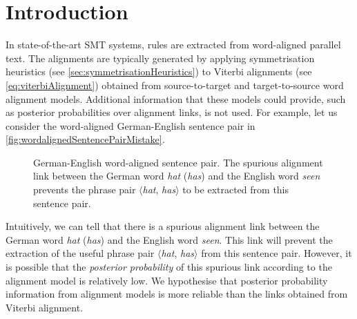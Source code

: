 \section{Introduction}
\label{sec:extractionFromPosteriorsIntro}

In state-of-the-art SMT systems, rules are extracted from %
word-aligned parallel text. The alignments are typically generated by
applying symmetrisation
heuristics (see \autoref{sec:symmetrisationHeuristics}) to Viterbi
alignments (see \autoref{eq:viterbiAlignment}) obtained
from source-to-target and target-to-source word alignment models.
Additional information that these models could provide, such as posterior
probabilities over alignment links, is not used. For example, let us consider
the word-aligned German-English sentence pair in
\autoref{fig:wordalignedSentencePairMistake}.
%
\begin{figure}
  \begin{center}
  \end{center}
  \caption{German-English word-aligned sentence pair. The spurious alignment
  link between the German word \emph{hat} (\emph{has}) and the English word \emph{seen}
  prevents the phrase pair $\langle$\emph{hat}, \emph{has}$\rangle$ to be extracted from this
  sentence pair.}
  \label{fig:wordalignedSentencePairMistake}
\end{figure}
%
Intuitively, we can tell that
there is a spurious alignment link between the German
word \emph{hat} (\emph{has}) and the
English word \emph{seen}. This link will prevent the extraction of the useful
phrase pair $\langle$\emph{hat}, \emph{has}$\rangle$
from this sentence pair. However, it is
possible that the \emph{posterior probability} of this spurious link according
to the alignment model is relatively low. We hypothesise that posterior
probability information from alignment models is more reliable than the links
obtained from Viterbi alignment.


